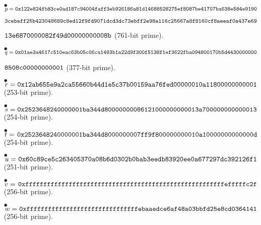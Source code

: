 \begin{itemize}
	\item[$\bullet$] $p = \tt{0x122e824fb83ce0ad187c94004faff3eb926186a81d14688528275ef8087be41707ba638e584e9190}$
	\item[] \hspace{0.53cm} $\tt{3cebaff25b423048689c8ed12f9fd9071dcd3dc73ebff2e98a116c25667a8f8160cf8aeeaf0a437e69}$
	\item[] \hspace{0.53cm} $\tt{13e6870000082f49d00000000008b}$ (761-bit prime).
	\item[$\bullet$] $q = \tt{0x01ae3a4617c510eac63b05c06ca1493b1a22d9f300f5138f1ef3622fba094800170b5d4430000000}$
	\item[] \hspace{0.52cm} $\tt{8508c00000000001}$ (377-bit prime).
	\item[$\bullet$] $r = \tt{0x12ab655e9a2ca55660b44d1e5c37b00159aa76fed00000010a11800000000001}$ (253-bit prime).
	\item[$\bullet$] $s = \tt{0x2523648240000001ba344d80000000086121000000000013a700000000000013}$ (254-bit prime).
	\item[$\bullet$] $t = \tt{\hspace{0.04cm}0x2523648240000001ba344d8000000007ff9f800000000010a10000000000000d}$ (254-bit prime).
	\item[$\bullet$] $u = \tt{\hspace{0.01cm}0x60c89ce5c263405370a08b6d0302b0bab3eedb83920ee0a677297dc392126f1}$ (251-bit prime).
	\item[$\bullet$] $v = \tt{\hspace{0.04cm}0xfffffffffffffffffffffffffffffffffffffffffffffffffffffffefffffc2f}$ (256-bit prime).
	\item[$\bullet$] $w = \tt{\hspace{0.01cm}0xfffffffffffffffffffffffffffffffebaaedce6af48a03bbfd25e8cd0364141}$ (256-bit prime).	
\end{itemize}

